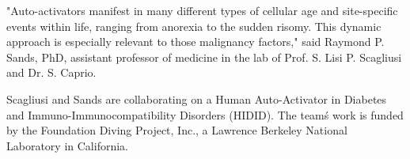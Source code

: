 \documentclass{article}
\begin{document}
"Auto-activators manifest in many different types of cellular age and site-specific events within life, ranging from anorexia to the sudden risomy. This dynamic approach is especially relevant to those malignancy factors," said Raymond P. Sands, PhD, assistant professor of medicine in the lab of Prof. S. Lisi P. Scagliusi and Dr. S. Caprio.

Scagliusi and Sands are collaborating on a Human Auto-Activator in Diabetes and Immuno-Immunocompatibility Disorders (HIDID). The team\'s work is funded by the Foundation Diving Project, Inc., a Lawrence Berkeley National Laboratory in California.
\end{document}
